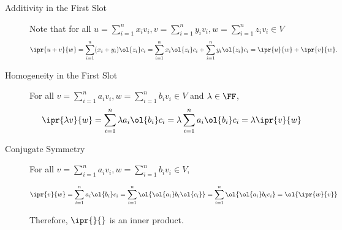 \documentclass[11pt]{scrartcl}
\begin{document}
\begin{enumerate}[label=\alph*)]
\begin{description}
\item[Additivity in the First Slot] \hfill

  Note that for all $u= \sum_{i=1}^nx_iv_i,v=\sum_{i=1}^ny_iv_i, w = \sum_{i=1}^nz_iv_i\in V$
  \[
    \ipr{u+v}{w} = \sum_{i=1}^n(x_i+y_i)\ol{z_i}c_i =  \sum_{i=1}^nx_i\ol{z_i}c_i + \sum_{i=1}^ny_i\ol{z_i}c_i = \ipr{u}{w}+\ipr{v}{w}.
  \]
  
\item[Homogeneity in the First Slot]\hfill

  For all $v = \sum_{i=1}^na_iv_i, w=\sum_{i=1}^nb_iv_i\in V$ and $\lambda \in \FF$,
  \[    \ipr{\lambda v}{w} = \sum_{i=1}^n\lambda a_i\ol{b_i}c_i = \lambda \sum_{i=1}^na_i\ol{b_i}c_i = \lambda \ipr{v}{w}
  \]
  
\item[Conjugate Symmetry] \hfill

  For all $v = \sum_{i=1}^na_iv_i, w=\sum_{i=1}^nb_iv_i\in V$,

  \[\ipr{v}{w} = \sum_{i=1}^n a_i\ol{b_i}c_i = \sum_{i=1}^n \ol{\ol{a_i}b_i\ol{c_i}} =  \sum_{i=1}^n \ol{\ol{a_i}b_ic_i} = \ol{\ipr{w}{v}}
  \]
  
  Therefore, $\ipr{\*}{\*}$ is an inner product.

\end{description}  

  







\end{enumerate}
\end{document}
